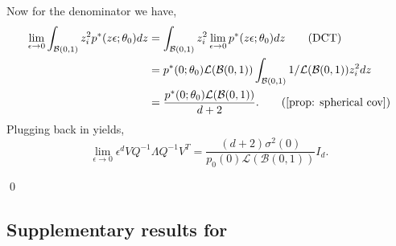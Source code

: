 \documentclass[11pt]{article}
\begin{document}
Now for the denominator we have,
\begin{align*}
    \lim_{\epsilon \rightarrow 0}\int_{\mathcal{B}(0, 1)}z_i^2p^*(z\epsilon; \theta_0) dz &= \int_{\mathcal{B}(0, 1)}z_i^2\lim_{\epsilon \rightarrow 0}p^*(z\epsilon; \theta_0) dz \tag{DCT} \\
    &= p^*(0; \theta_0)\mathcal{L}(\mathcal{B}(0,1))\int_{\mathcal{B}(0, 1)}1/\mathcal{L}(\mathcal{B}(0,1))z_i^2 dz \\
    &= \frac{p^*(0; \theta_0)\mathcal{L}(\mathcal{B}(0,1))}{d+2}. \tag{\Cref{prop: spherical cov}}
\end{align*}
Plugging back in yields,
\[\lim_{\epsilon \rightarrow 0}\epsilon^dVQ^{-1}\Lambda Q^{-1}V^T = \frac{(d+2)\sigma^2(0)}{p_0(0)\mathcal{L}(\mathcal{B}(0,1))}I_d.\]

\qed{}

\subsection{Supplementary results for }
\end{document}
